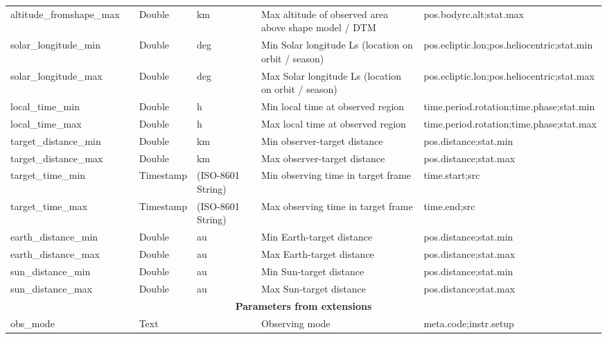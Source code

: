 \documentclass[11pt,a4paper]{ivoa}
\begin{document}
\begin{longtable}{p{3.5cm}p{0.5cm}p{1cm}p{1cm}p{7cm}p{3cm}}
altitude\_fromshape\_max&&Double&km&Max altitude of observed area above shape model / DTM&pos.bodyrc.alt;stat.max\\

solar\_longitude\_min&&Double&deg&Min Solar longitude Ls (location on orbit / season)&pos.ecliptic.lon;pos.heliocentric;stat.min  \\

solar\_longitude\_max&&Double&deg&Max Solar longitude Ls (location on orbit / season)&pos.ecliptic.lon;pos.heliocentric;stat.max \\

local\_time\_min&&Double&h&Min local time at observed region&time.period.rotation;time.phase;stat.min\\

local\_time\_max&&Double&h&Max local time at observed region&time.period.rotation;time.phase;stat.max \\

target\_distance\_min&&Double&km&Min observer-target distance&pos.distance;stat.min\\

target\_distance\_max&&Double&km&Max observer-target distance&pos.distance;stat.max\\

target\_time\_min&&Timestamp&(ISO-8601 String)&Min observing time in target frame&time.start;src\\

target\_time\_max&&Timestamp&(ISO-8601 String)&Max observing time in target frame&time.end;src\\

earth\_distance\_min&&Double&au&Min Earth-target distance&pos.distance;stat.min\\

earth\_distance\_max&&Double&au&Max Earth-target distance&pos.distance;stat.max\\

sun\_distance\_min&&Double&au&Min Sun-target distance&pos.distance;stat.min\\

sun\_distance\_max&&Double&au&Max Sun-target distance&pos.distance;stat.max\\

\multicolumn{6}{c}{\vrule width 0pt height 20pt depth 12pt \textbf{\textbf{Parameters from extensions}}}\\

obs\_mode&&Text&&Observing mode&meta.code;instr.setup\\


\end{longtable}
\end{document}
